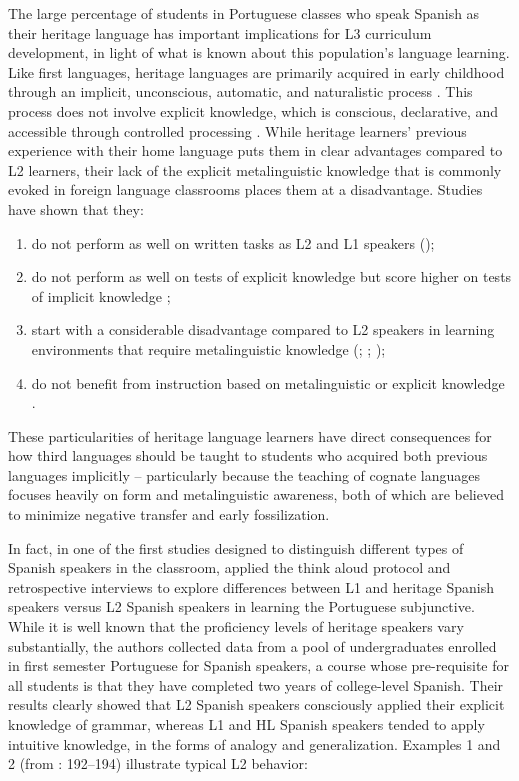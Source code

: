 \documentclass[output=paper]{../langscibook}
\begin{document}
The large percentage of students in Portuguese classes who speak Spanish as their heritage language has important implications for L3 curriculum development, in light of what is known about this population’s language learning. Like first languages, heritage languages are primarily acquired in early childhood through an implicit, unconscious, automatic, and naturalistic process \citep{Zyzik2016}. This process does not involve explicit knowledge, which is conscious, declarative, and accessible through controlled processing \citep{Bowles2011}. While heritage learners’ previous experience with their home language puts them in clear advantages compared to L2 learners, their lack of the explicit metalinguistic knowledge that is commonly evoked in foreign language classrooms places them at a disadvantage. Studies have shown that they:

\begin{enumerate}
\item do not perform as well on written tasks as L2 and L1 speakers (\citealt{MontrulEtAl2008});
\item do not perform as well on tests of explicit knowledge but score higher on tests of implicit knowledge \citep{Bowles2011};
\item
start with a considerable disadvantage compared to L2 speakers in learning environments that require metalinguistic knowledge (\citealt{Correa2014}; \citealt{Carreira2017}; \citealt{PotowskiEtAl2009});
\item
do not benefit from instruction based on metalinguistic or explicit knowledge \citep{Beaudrie2017}.
\end{enumerate}

These particularities of heritage language learners have direct consequences for how third languages should be taught to students who acquired both previous languages implicitly -- particularly because the teaching of cognate languages focuses heavily on form and metalinguistic awareness, both of which are believed to minimize negative transfer and early fossilization. 

In fact, in one of the first studies designed to distinguish different types of Spanish speakers in the classroom, \citet{CarvalhoSilva2006} applied the think aloud protocol and retrospective interviews to explore differences between L1 and heritage Spanish speakers versus L2 Spanish speakers in learning the Portuguese subjunctive. While it is well known that the proficiency levels of heritage speakers vary substantially, the authors collected data from a pool of undergraduates enrolled in first semester Portuguese for Spanish speakers, a course whose pre-requisite for all students is that they have completed two years of college-level Spanish. Their results clearly showed that L2 Spanish speakers consciously applied their explicit knowledge of grammar, whereas L1 and HL Spanish speakers tended to apply intuitive knowledge, in the forms of analogy and generalization. Examples 1 and 2 (from \citealt{CarvalhoSilva2006}: 192–194) illustrate typical L2 behavior:
\end{document}
